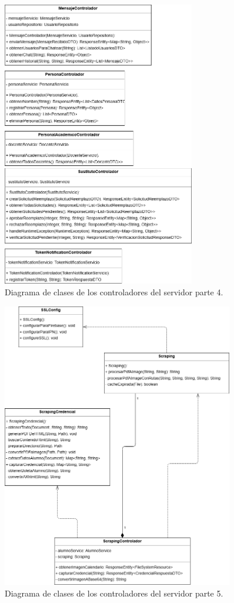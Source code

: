 \begin{figure}[htbp!]
	\begin{center}
		\includegraphics[width=0.75\textwidth]{Clases/Controlador4.png}
		\caption{Diagrama de clases de los controladores del servidor parte 4.}
		\label{fig:DC4}
	\end{center}
\end{figure}

\begin{figure}[htbp!]
	\begin{center}
		\includegraphics[width=0.9\textwidth]{Clases/Controlador5.png}
		\caption{Diagrama de clases de los controladores del servidor parte 5.}
		\label{fig:DC5}
	\end{center}
\end{figure}